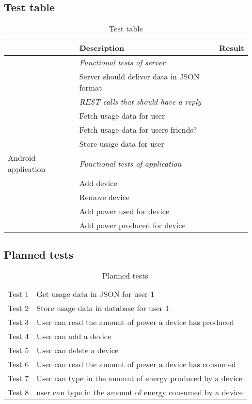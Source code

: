 \subsection{Test table}

\begin{table}[H]
\begin{tabular}{|l|l|l|}
\hline
\rowcolor{darkgray} & \textbf{Description} & \textbf{Result}\\\hline
\rowcolor{lightgray} \multirow{6}{*}{Server} & \textit{Functional tests of server}&\\
\rowcolor{lightgray}&Server should deliver data in JSON format&\\
\rowcolor{lightgray}&\textit{REST calls that should have a reply}&\\
\rowcolor{lightgray}&Fetch usage data for user&\\
\rowcolor{lightgray}&Fetch usage data for users friends?&\\
\rowcolor{lightgray}&Store usage data for user&\\\hline
\rowcolor{darkgray}Android application & \textit{Functional tests of application} &  \\
\rowcolor{darkgray}&Add device&\\
\rowcolor{darkgray}&Remove device&\\
\rowcolor{darkgray}&Add power used for device&\\
\rowcolor{darkgray}&Add power produced for device&\\
\hline
\end{tabular}
\caption{Test table}
\label{tab:testTable}
\end{table}

\subsection{Planned tests}
\begin{table}[H]
\centering
{}
\begin{tabular}{|l|l|}
\hline
Test 1&Get usage data in JSON for user 1\\
Test 2&Store usage data in database for user 1\\
Test 3&User can read the amount of power a device has produced\\
Test 4&User can add a device\\
Test 5&User can delete a device\\
Test 6&User can read the amount of power a device has consumed\\
Test 7&User can type in the amount of energy produced by a device\\
Test 8&user can type in the amount of energy consumed by a device\\
\hline
\end{tabular}
\caption{Planned tests}
\label{tab:plannedTable}
\end{table}

